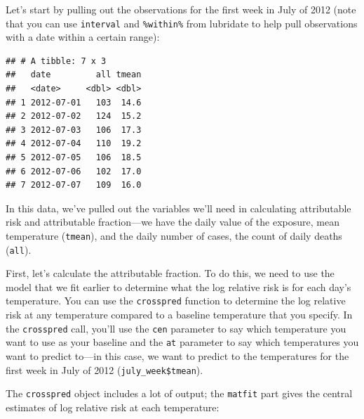 \documentclass[
]{book}
\newenvironment{Shaded}{\begin{snugshade}}{\end{snugshade}}
\newcommand{\KeywordTok}[1]{\textcolor[rgb]{0.13,0.29,0.53}{\textbf{#1}}}
\newcommand{\NormalTok}[1]{#1}
\newcommand{\OperatorTok}[1]{\textcolor[rgb]{0.81,0.36,0.00}{\textbf{#1}}}
\newcommand{\StringTok}[1]{\textcolor[rgb]{0.31,0.60,0.02}{#1}}
\begin{document}
Let's start by pulling out the observations for the first week in July of 2012 (note that you can use \texttt{interval} and \texttt{\%within\%} from lubridate to help pull observations with a date within a certain range):

\begin{Shaded}
\end{Shaded}

\begin{verbatim}
## # A tibble: 7 x 3
##   date         all tmean
##   <date>     <dbl> <dbl>
## 1 2012-07-01   103  14.6
## 2 2012-07-02   124  15.2
## 3 2012-07-03   106  17.3
## 4 2012-07-04   110  19.2
## 5 2012-07-05   106  18.5
## 6 2012-07-06   102  17.0
## 7 2012-07-07   109  16.0
\end{verbatim}

In this data, we've pulled out the variables we'll need in calculating attributable risk and attributable fraction---we have the daily value of the exposure, mean temperature (\texttt{tmean}), and the daily number of cases, the count of daily deaths (\texttt{all}).

First, let's calculate the attributable fraction. To do this, we need to use
the model that we fit earlier to determine what the log relative risk is for each day's temperature. You can use the \texttt{crosspred} function to determine the log relative risk at any temperature compared to a baseline temperature that you specify. In the \texttt{crosspred} call, you'll use the \texttt{cen} parameter to say which temperature you want to use as your baseline and the \texttt{at} parameter to say which temperatures you want to predict to---in this case, we want to predict to the temperatures for the first week in July of 2012 (\texttt{july\_week\$tmean}).

The \texttt{crosspred} object includes a lot of output; the \texttt{matfit} part gives the central estimates of log relative risk at each temperature:
\end{document}
